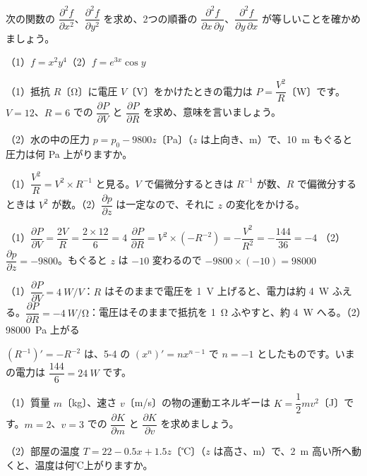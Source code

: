 \begin{jibun}
次の関数の $\dfrac{\partial^2f}{\partial x^2}$、$\dfrac{\partial^2f}{\partial y^2}$ を求め、2つの順番の $\dfrac{\partial^2f}{\partial x\,\partial y}$、$\dfrac{\partial^2f}{\partial y\,\partial x}$ が等しいことを確かめましょう。\par
（1）$f=x^2y^4$\qquad（2）$f=e^{3x}\cos y$
\end{jibun}

\begin{reidai}[物理の式を偏微分する]
（1）抵抗 $R$〔Ω〕に電圧 $V$〔V〕をかけたときの電力は $P=\dfrac{V^2}{R}$〔W〕です。$V=12$、$R=6$ での $\dfrac{\partial P}{\partial V}$ と $\dfrac{\partial P}{\partial R}$ を求め、意味を言いましょう。\par
（2）水の中の圧力 $p=p_0-9800z$〔Pa〕（$z$ は上向き、m）で、\qty{10}{m} もぐると圧力は何 Pa 上がりますか。\par
\kangaekata（1）$\dfrac{V^2}{R}=V^2\times R^{-1}$ と見る。$V$ で偏微分するときは $R^{-1}$ が数、$R$ で偏微分するときは $V^2$ が数。（2）$\dfrac{\partial p}{\partial z}$ は一定なので、それに $z$ の変化をかける。\par
\shiki（1）$\dfrac{\partial P}{\partial V}=\dfrac{2V}{R}=\dfrac{2\times12}{6}=4$\kviiicq
$\dfrac{\partial P}{\partial R}=V^2\times(-R^{-2})=-\dfrac{V^2}{R^2}=-\dfrac{144}{36}=-4$\kviiicq
（2）$\dfrac{\partial p}{\partial z}=-9800$。もぐると $z$ は $-10$ 変わるので $-9800\times(-10)=\num{98000}$\par
\kotae（1）\nobreak $\dfrac{\partial P}{\partial V}=\qty{4}{W/V}$：$R$ はそのままで電圧を \qty{1}{V} 上げると、電力は約 \qty{4}{W} ふえる。$\dfrac{\partial P}{\partial R}=\qty{-4}{W/\ohm}$：電圧はそのままで抵抗を \qty{1}{\ohm} ふやすと、約 \qty{4}{W} へる。（2）\nobreak \qty{98000}{Pa} 上がる
\end{reidai}
\noindent $(R^{-1})'=-R^{-2}$ は、5-4 の $(x^n)'=nx^{n-1}$ で $n=-1$ としたものです。いまの電力は $\dfrac{144}{6}=\qty{24}{W}$ です。

\begin{jibun}
（1）質量 $m$〔kg〕、速さ $v$〔m/s〕の物の運動エネルギーは $K=\dfrac{1}{2}mv^2$〔J〕です。$m=2$、$v=3$ での $\dfrac{\partial K}{\partial m}$ と $\dfrac{\partial K}{\partial v}$ を求めましょう。\par
（2）部屋の温度 $T=22-0.5x+1.5z$〔℃〕（$z$ は高さ、m）で、\qty{2}{m} 高い所へ動くと、温度は何℃上がりますか。
\end{jibun}

